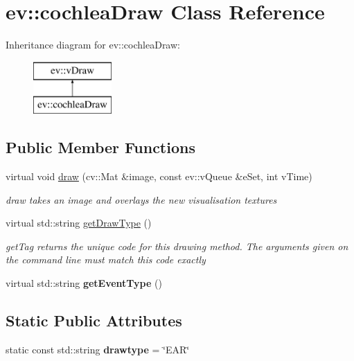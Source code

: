 \hypertarget{classev_1_1cochleaDraw}{}\section{ev\+:\+:cochlea\+Draw Class Reference}
\label{classev_1_1cochleaDraw}
Inheritance diagram for ev\+:\+:cochlea\+Draw\+:\begin{figure}[H]
\begin{center}
\leavevmode
\includegraphics[height=2.000000cm]{classev_1_1cochleaDraw}
\end{center}
\end{figure}
\subsection*{Public Member Functions}
\begin{DoxyCompactItemize}
\item 
virtual void \hyperlink{classev_1_1cochleaDraw_a2b06c53991065506fcdaa9afec8282af}{draw} (cv\+::\+Mat \&image, const ev\+::v\+Queue \&e\+Set, int v\+Time)
\begin{DoxyCompactList}\small\item\em draw takes an image and overlays the new visualisation textures \end{DoxyCompactList}\item 
virtual std\+::string \hyperlink{classev_1_1cochleaDraw_a722aac2b6c1af1f6691721beb8a25325}{get\+Draw\+Type} ()
\begin{DoxyCompactList}\small\item\em get\+Tag returns the unique code for this drawing method. The arguments given on the command line must match this code exactly \end{DoxyCompactList}\item 
\mbox{\label{classev_1_1cochleaDraw_afa164b9b693c4b0c41737c9ae35b2cef}} 
virtual std\+::string {\bfseries get\+Event\+Type} ()
\end{DoxyCompactItemize}
\subsection*{Static Public Attributes}
\begin{DoxyCompactItemize}
\item 
\mbox{\label{classev_1_1cochleaDraw_a649ade5bf1b9b8ba53b365d3103c76b9}} 
static const std\+::string {\bfseries drawtype} = \char`\"{}E\+AR\char`\"{}
\end{DoxyCompactItemize}
